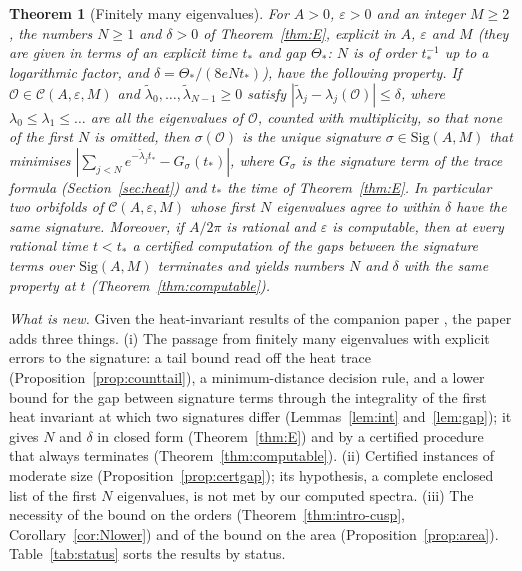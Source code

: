 \documentclass[pdflatex,sn-mathphys-num]{sn-jnl}
\theoremstyle{thmstyleone}%
\newtheorem{theorem}{Theorem}[section]%
\theoremstyle{thmstylethree}%
\newcommand{\Orb}{\mathcal{O}}
\newcommand{\Cl}{\mathcal{C}}
\newcommand{\Sig}{\mathrm{Sig}}
\begin{document}
\begin{theorem}[Finitely many eigenvalues]\label{thm:intro}
For $A>0$, $\varepsilon>0$ and an integer $M\ge2$, the numbers $N\ge1$ and $\delta>0$ of Theorem~\ref{thm:E}, explicit in $A$, $\varepsilon$ and $M$ (they are given in terms of an explicit time $t_*$ and gap $\Theta_*$: $N$ is of order $t_*^{-1}$ up to a logarithmic factor, and $\delta=\Theta_*/(8eNt_*)$), have the following property. If $\Orb\in\Cl(A,\varepsilon,M)$ and $\tilde\lambda_0,\dots,\tilde\lambda_{N-1}\ge0$ satisfy $|\tilde\lambda_j-\lambda_j(\Orb)|\le\delta$, where $\lambda_0\le\lambda_1\le\dots$ are all the eigenvalues of $\Orb$, counted with multiplicity, so that none of the first $N$ is omitted, then $\sigma(\Orb)$ is the unique signature $\sigma\in\Sig(A,M)$ that minimises $|\sum_{j<N}e^{-\tilde\lambda_jt_*}-G_\sigma(t_*)|$, where $G_\sigma$ is the signature term of the trace formula (Section~\ref{sec:heat}) and $t_*$ the time of Theorem~\ref{thm:E}. In particular two orbifolds of $\Cl(A,\varepsilon,M)$ whose first $N$ eigenvalues agree to within $\delta$ have the same signature. Moreover, if $A/2\pi$ is rational and $\varepsilon$ is computable, then at every rational time $t<t_*$ a certified computation of the gaps between the signature terms over $\Sig(A,M)$ terminates and yields numbers $N$ and $\delta$ with the same property at $t$ (Theorem~\ref{thm:computable}).
\end{theorem}

\emph{What is new.} Given the heat-invariant results of the companion paper \cite{companionA}, the paper adds three things. (i) The passage from finitely many eigenvalues with explicit errors to the signature: a tail bound read off the heat trace (Proposition~\ref{prop:counttail}), a minimum-distance decision rule, and a lower bound for the gap between signature terms through the integrality of the first heat invariant at which two signatures differ (Lemmas~\ref{lem:int} and~\ref{lem:gap}); it gives $N$ and $\delta$ in closed form (Theorem~\ref{thm:E}) and by a certified procedure that always terminates (Theorem~\ref{thm:computable}). (ii) Certified instances of moderate size (Proposition~\ref{prop:certgap}); its hypothesis, a complete enclosed list of the first $N$ eigenvalues, is not met by our computed spectra. (iii) The necessity of the bound on the orders (Theorem~\ref{thm:intro-cusp}, Corollary~\ref{cor:Nlower}) and of the bound on the area (Proposition~\ref{prop:area}). Table~\ref{tab:status} sorts the results by status.
\end{document}
